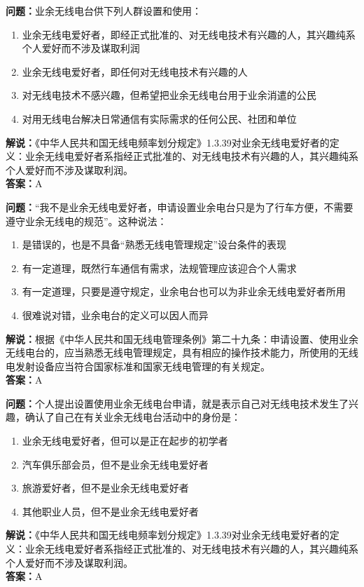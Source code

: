 \documentclass{ctexbook}%
\begin{document}
\textbf{问题：}业余无线电台供下列人群设置和使用：
\begin{enumerate}[label=\Alph*), leftmargin=3em]
\item 业余无线电爱好者，即经正式批准的、对无线电技术有兴趣的人，其兴趣纯系个人爱好而不涉及谋取利润
\item 业余无线电爱好者，即任何对无线电技术有兴趣的人
\item 对无线电技术不感兴趣，但希望把业余无线电台用于业余消遣的公民
\item 对用无线电台解决日常通信有实际需求的任何公民、社团和单位
\end{enumerate}
\textbf{解说：}《中华人民共和国无线电频率划分规定》1.3.39对业余无线电爱好者的定义：业余无线电爱好者系指经正式批准的、对无线电技术有兴趣的人，其兴趣纯系个人爱好而不涉及谋取利润。\\
\textbf{答案：}A

\textbf{问题：}“我不是业余无线电爱好者，申请设置业余电台只是为了行车方便，不需要遵守业余无线电的规范”。这种说法：
\begin{enumerate}[label=\Alph*), leftmargin=3em]
\item 是错误的，也是不具备“熟悉无线电管理规定”设台条件的表现
\item 有一定道理，既然行车通信有需求，法规管理应该迎合个人需求
\item 有一定道理，只要是遵守规定，业余电台也可以为非业余无线电爱好者所用
\item 很难说对错，业余电台的定义可以因人而异
\end{enumerate}
\textbf{解说：}根据《中华人民共和国无线电管理条例》第二十九条：申请设置、使用业余无线电台的，应当熟悉无线电管理规定，具有相应的操作技术能力，所使用的无线电发射设备应当符合国家标准和国家无线电管理的有关规定。\\
\textbf{答案：}A

\textbf{问题：}个人提出设置使用业余无线电台申请，就是表示自己对无线电技术发生了兴趣，确认了自己在有关业余无线电台活动中的身份是：
\begin{enumerate}[label=\Alph*), leftmargin=3em]
\item 业余无线电爱好者，但可以是正在起步的初学者
\item 汽车俱乐部会员，但不是业余无线电爱好者
\item 旅游爱好者，但不是业余无线电爱好者
\item 其他职业人员，但不是业余无线电爱好者
\end{enumerate}
\textbf{解说：}《中华人民共和国无线电频率划分规定》1.3.39对业余无线电爱好者的定义：业余无线电爱好者系指经正式批准的、对无线电技术有兴趣的人，其兴趣纯系个人爱好而不涉及谋取利润。\\
\textbf{答案：}A
\end{document}
